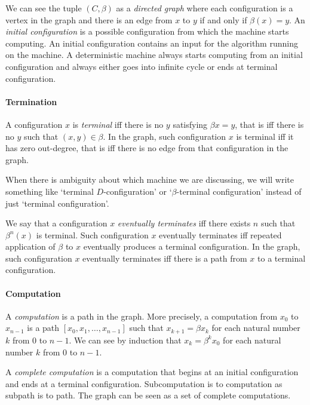 We can see the tuple $(C,\beta)$ as a \emph{directed graph}
where each configuration is a vertex in the graph
and there is an edge from $x$ to $y$ if and only if $\beta(x) = y$.
An \emph{initial configuration} is a possible configuration from which the machine starts computing.
An initial configuration contains an input for the algorithm running on the machine.
A deterministic machine always starts computing from an initial configuration
and always either goes into infinite cycle or ends at terminal configuration.

\paragraph{Termination}
A configuration $x$ is \emph{terminal} iff
there is no $y$ satisfying $\beta x = y$, that is iff there is no $y$ such that $(x,y) \in \beta$.
In the graph, such configuration $x$ is terminal iff it has zero out-degree,
that is iff there is no edge from that configuration in the graph.

When there is ambiguity about which machine we are discussing,
we will write something like `terminal $D$-configuration'
or `$\beta$-terminal configuration' instead of just `terminal configuration'.

We say that a configuration $x$ \emph{eventually terminates}
iff there exists $n$ such that $\beta^n(x)$ is terminal.
Such configuration $x$ eventually terminates iff repeated application of $\beta$ to $x$
eventually produces a terminal configuration.
In the graph, such configuration $x$ eventually terminates iff
there is a path from $x$ to a terminal configuration.

\paragraph{Computation}
A \emph{computation} is a path in the graph.
More precisely, a computation from $x_0$ to $x_{n-1}$
is a path $[x_0, x_1, \ldots, x_{n-1}]$
such that $x_{k+1} = \beta x_k$ for each natural number $k$ from $0$ to $n-1$.
We can see by induction that $x_k = \beta^k x_0$ for each natural number $k$ from $0$ to $n-1$.

A \emph{complete computation} is a computation that begins at an initial configuration
and ends at a terminal configuration.
Subcomputation is to computation as subpath is to path.
The graph can be seen as a set of complete computations.

